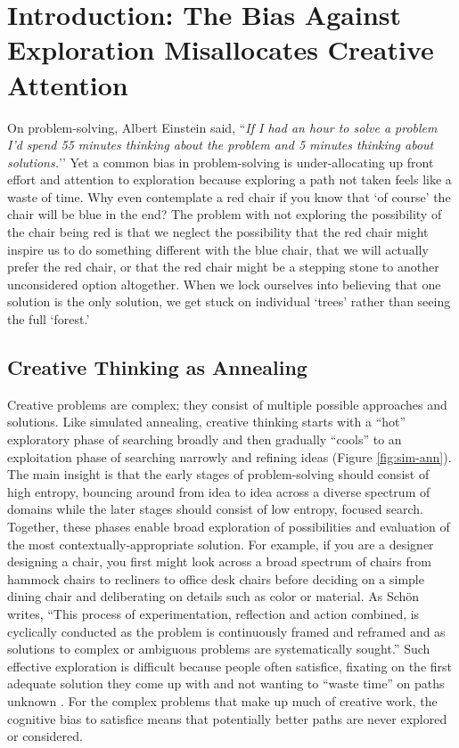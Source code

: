 \chapter{Introduction: The Bias Against Exploration Misallocates Creative Attention}

On problem-solving, Albert Einstein said, ``\textit{If I had an hour to solve a problem I’d spend 55 minutes thinking about the problem and 5 minutes thinking about solutions.}’’ Yet a common bias in problem-solving is under-allocating up front effort and attention to exploration because exploring a path not taken feels like a waste of time. Why even contemplate a red chair if you know that ‘of course’ the chair will be blue in the end? The problem with not exploring the possibility of the chair being red is that we neglect the possibility that the red chair might inspire us to do something different with the blue chair, that we will actually prefer the red chair, or that the red chair might be a stepping stone to another unconsidered option altogether. When we lock ourselves into believing that one solution is the only solution, we get stuck on individual ‘trees’ rather than seeing the full ‘forest.’

\section{Creative Thinking as Annealing}

Creative problems are complex; they consist of multiple possible approaches and solutions. Like simulated annealing, creative thinking starts with a “hot” exploratory phase of searching broadly and then gradually “cools” to an exploitation phase of searching narrowly and refining ideas \cite{kirkpatrick1983optimization, lucas2014children, Newell1962processes} (Figure \ref{fig:sim-ann}). The main insight is that the early stages of problem-solving should consist of high entropy, bouncing around from idea to idea across a diverse spectrum of domains while the later stages should consist of low entropy, focused search. Together, these phases enable broad exploration of possibilities and evaluation of the most contextually-appropriate solution. For example, if you are a designer designing a chair, you first might look across a broad spectrum of chairs from hammock chairs to recliners to office desk chairs before deciding on a simple dining chair and deliberating on details such as color or material. As Schön \cite{schon1984reflective} writes, “This process of experimentation, reflection and action combined, is cyclically conducted as the problem is continuously framed and reframed and as solutions to complex or ambiguous problems are systematically sought.” Such effective exploration is difficult because people often satisfice, fixating on the first adequate solution they come up with and not wanting to “waste time” on paths unknown \cite{simon1972theories}. For the complex problems that make up much of creative work, the cognitive bias to satisfice means that potentially better paths are never explored or considered.

